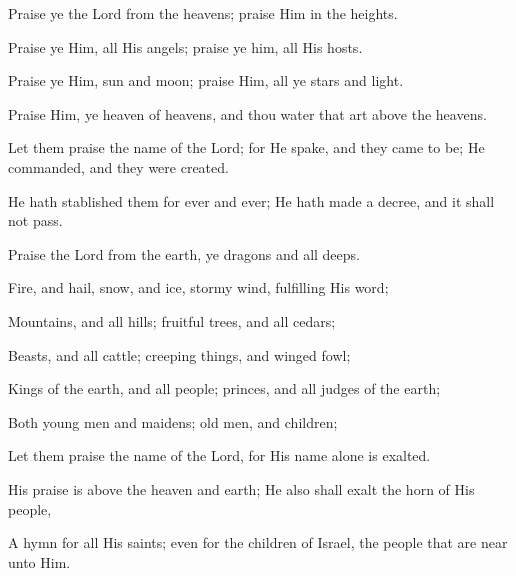 Praise ye the Lord from the heavens; praise Him in the heights.

Praise ye Him, all His angels; praise ye him, all His hosts.

Praise ye Him, sun and moon; praise Him, all ye stars and light.

Praise Him, ye heaven of heavens, and thou water that art above the heavens.

Let them praise the name of the Lord; for He spake, and they came to be; He commanded, and they were created.

He hath stablished them for ever and ever; He hath made a decree, and it shall not pass.

Praise the Lord from the earth, ye dragons and all deeps.

Fire, and hail, snow, and ice, stormy wind, fulfilling His word;

Mountains, and all hills; fruitful trees, and all cedars;

Beasts, and all cattle; creeping things, and winged fowl;

Kings of the earth, and all people; princes, and all judges of the earth;

Both young men and maidens; old men, and children;

Let them praise the name of the Lord, for His name alone is exalted.

His praise is above the heaven and earth; He also shall exalt the horn of His people,

A hymn for all His saints; even for the children of Israel, the people that are near unto Him.
